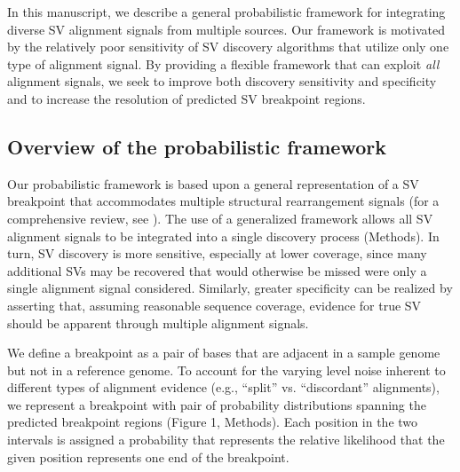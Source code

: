 \documentclass[11pt]{article}
\begin{document}
In this manuscript, we describe a general probabilistic framework for 
integrating diverse SV alignment signals from multiple sources. Our framework is
motivated by the relatively poor sensitivity of SV discovery algorithms
that utilize only one type of alignment signal. By providing a flexible 
framework that can exploit \emph{all} alignment signals, we seek to improve 
both discovery sensitivity and specificity and to increase the resolution of 
predicted SV breakpoint regions.

\subsection{Overview of the probabilistic framework}

Our probabilistic framework is based upon a general representation of a SV 
breakpoint that accommodates multiple structural rearrangement signals (for a 
comprehensive review, see \cite{alkan2011}). The use of a generalized framework
allows all SV alignment signals to be integrated into a single discovery
process (Methods). In turn, SV discovery is more sensitive, 
especially at lower coverage, since many additional SVs may be recovered that 
would otherwise be missed were only a single alignment signal considered. 
Similarly, greater specificity can be realized by asserting that, assuming 
reasonable sequence coverage, evidence for true SV should be apparent through 
multiple alignment signals.

We define a breakpoint as a pair of bases that are adjacent in a sample genome 
but not in a reference genome.  To account for the varying level noise inherent 
to different types of alignment evidence (e.g., ``split'' vs. ``discordant'' 
alignments), we represent a breakpoint with pair of probability distributions
spanning the predicted breakpoint regions (Figure 1, Methods).  Each position 
in the two intervals is assigned a probability that represents the relative 
likelihood that the given position represents one end of the breakpoint. 

\end{document}

